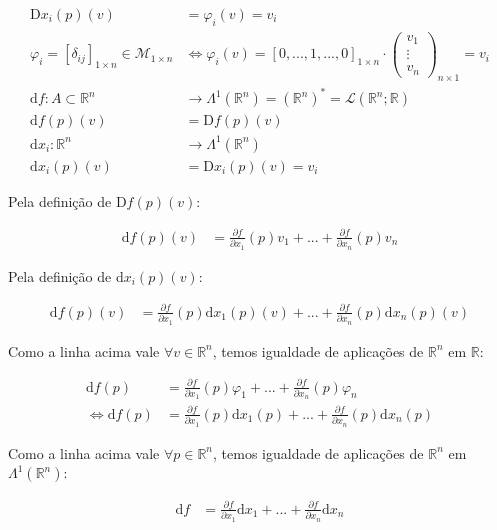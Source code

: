 \documentclass[12pt,a4paper]{article}
\begin{document}
\begin{align}
			\mathrm{D}x_i (p) (v) &= \varphi_i (v) = v_i \\
			\varphi_i = [\delta_{ij}]_{1 \times n} \in \mathcal{M}_{1 \times n} &\Leftrightarrow \varphi_i (v) = [0,...,1,...,0]_{1 \times n} \cdot \begin{pmatrix} v_1 \\ \vdots \\ v_n \end{pmatrix}_{n \times 1} = v_i \\
			\mathrm{d}f : A \subset \mathbb{R}^n &\rightarrow \Lambda^1(\mathbb{R}^n) = (\mathbb{R}^n)^* = \mathcal{L}(\mathbb{R}^n ; \mathbb{R}) \\
			\mathrm{d}f (p) (v) &= \mathrm{D}f(p) (v) \\
			\mathrm{d}x_i : \mathbb{R}^n &\rightarrow \Lambda^1(\mathbb{R}^n) \\
			\mathrm{d}x_i (p) (v) &= \mathrm{D}x_i(p) (v) = v_i
		\end{align}
		
		Pela defini\c{c}\~ao de D$f(p)(v)$:

		\begin{align}
			\mathrm{d}f(p)(v) &= \frac{\partial f}{\partial x_1} (p) v_1 + ... + \frac{\partial f}{\partial x_n} (p) v_n
		\end{align}
		
		Pela defini\c{c}\~ao de d$x_i(p)(v)$:

		\begin{align}
			\mathrm{d}f(p)(v) &= \frac{\partial f}{\partial x_1} (p) \mathrm{d}x_1 (p) (v) + ... + \frac{\partial f}{\partial x_n} (p) \mathrm{d}x_n (p) (v)
		\end{align}
		
		Como a linha acima vale $\forall v \in \mathbb{R}^n$, temos igualdade de aplica\c{c}\~oes de $\mathbb{R}^n$ em $\mathbb{R}$:
		
		\begin{align}
			\mathrm{d}f(p) &= \frac{\partial f}{\partial x_1} (p) \varphi_1 + ... + \frac{\partial f}{\partial x_n} (p) \varphi_n \\
			\Leftrightarrow \mathrm{d}f(p) &= \frac{\partial f}{\partial x_1} (p) \mathrm{d}x_1 (p) + ... + \frac{\partial f}{\partial x_n} (p) \mathrm{d}x_n (p)
		\end{align}
		
		Como a linha acima vale $\forall p \in \mathbb{R}^n$, temos igualdade de aplica\c{c}\~oes de $\mathbb{R}^n$ em $\Lambda^1(\mathbb{R}^n)$:
		
		\begin{align}
			\mathrm{d}f &= \frac{\partial f}{\partial x_1} \mathrm{d}x_1 + ... + \frac{\partial f}{\partial x_n} \mathrm{d}x_n
		\end{align}		
\end{document}
